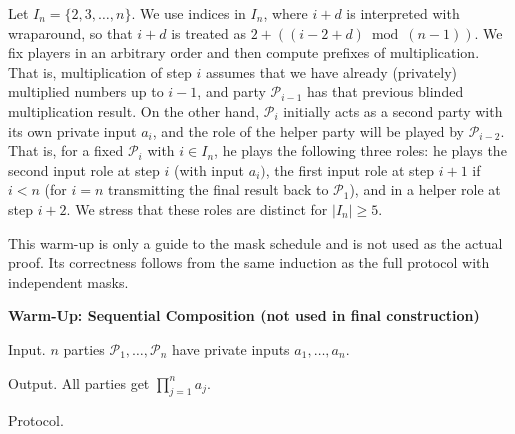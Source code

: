 Let $I_{n}=\{2,3,\dots,n\}$. We use indices in $I_{n}$, where $i+d$ is interpreted with wraparound, so that $i+d$ is treated as $2+((i-2+d)\bmod(n-1))$. We fix players in an arbitrary order and then compute prefixes of multiplication. That is, multiplication of step $i$ assumes that we have already (privately) multiplied numbers up to $i-1$, and party
$\mathcal{P}_{i-1}$ has that previous blinded multiplication result. On the other hand, $\mathcal{P}_{i}$ initially acts as a second party with its own private input $a_{i}$, and the role of the helper party will be played by
$\mathcal{P}_{i-2}$. That is, for a fixed $\mathcal{P}_{i}$ with $i\in I_{n}$, he plays the following three roles: he plays the second input role at step $i$ (with input $a_{i})$, the first input role at step $i+1$ if $i<n$ (for $i=n$ transmitting the final result back to $\mathcal{P}_{1}$), and in a helper role at step $i+2$. We stress that these roles are distinct for $|I_{n}|\geq 5$.\par




This warm-up is only a guide to the mask schedule and is not used as the actual proof. Its correctness follows from the same induction as the full protocol with independent masks.\par





{\bfseries Warm-Up: Sequential Composition (not used in final construction)


Input.
$n$ parties $\mathcal{P}_{1},\dots,\mathcal{P}_{n}$ have private inputs $a_{1},\dots,a_{n}$.


Output. All parties get $\prod_{j=1}^{n}a_{j}$.


Protocol.}\par



